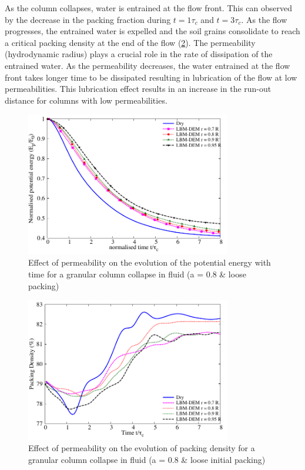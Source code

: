 As the column collapses, water is entrained at the flow front. This can 
observed by the decrease in the packing fraction during $t = 1\tau_c$ and $t = 
3\tau_c$. As the flow progresses, the entrained water is expelled and the soil 
grains consolidate to reach a critical packing density at the end of the flow 
(\cref{fig:Packing_Density_a08_loose}). The permeability (hydrodynamic 
radius) plays a crucial role in the rate of dissipation of the entrained water. 
As the permeability decreases, the water entrained at the flow front takes 
longer time to be dissipated resulting in lubrication of the flow at low 
permeabilities. This lubrication effect results in an increase in the run-out 
distance for columns with low permeabilities.

\begin{figure}
	\centering
    \includegraphics[width=0.8\textwidth]{PE_a08_loose}
    \caption{Effect of permeability on the evolution of the potential energy 
    with time for a granular column collapse in fluid (a = 0.8 \& loose 
    packing)}
    \label{fig:PE_a08_loose}
\end{figure}


\begin{figure}
	\centering
    \includegraphics[width=0.8\textwidth]{Packing_Density_a08_loose}
    \caption{Effect of permeability on the evolution of packing density for a 
    granular column collapse in fluid (a = 0.8 \& loose initial packing)}
    \label{fig:Packing_Density_a08_loose}
\end{figure}

